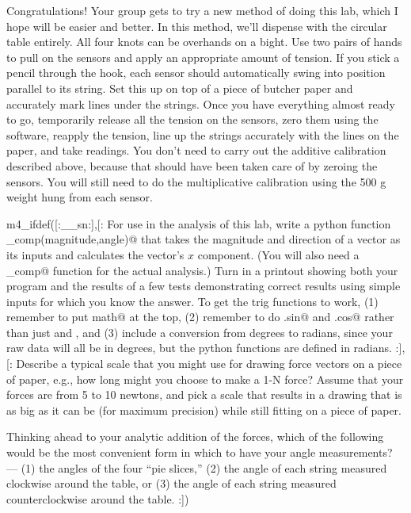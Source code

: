 Congratulations! Your group gets to try a new method of doing this lab, which I hope will be easier and
better. In this method, we'll dispense with the circular table entirely. All four knots can be overhands
on a bight. Use two pairs of hands to pull on the sensors and apply an appropriate amount of tension. If
you stick a pencil through the hook, each sensor should automatically swing into position parallel to its
string. Set this up on top of a piece of butcher paper and accurately mark lines under the strings.
Once you have everything almost ready to go, temporarily release all the tension on the sensors, zero them
using the software, reapply the tension, line up the strings accurately with the lines on the paper, and
take readings. You don't need to carry out the additive calibration described above, because that should
have been taken care of by zeroing the sensors. You will still need to do the multiplicative calibration
using the 500 g weight hung from each sensor.

\prelab

m4_ifdef([:__sn:],[:%
\prelabquestion For use in the analysis of this lab, write a python function \verb@x_comp(magnitude,angle)@ that
takes the magnitude and direction of a vector as its inputs and calculates the vector's $x$ component.
(You will also need a \verb@y_comp@ function for the actual analysis.)
Turn in a printout showing both your program and the results of a few tests demonstrating correct results
using simple inputs for which you know the answer.
To get the trig functions to work, (1) remember to put \verb@import math@ at the top, (2) remember to do \verb@math.sin@
and \verb@math.cos@ rather than just \verb@sin@ and \verb@cos@, and (3) include a conversion from degrees to radians, since
your raw data will all be in degrees, but the python functions are defined in radians.
:],[:%
\prelabquestion  Describe a typical scale that you might use for drawing
force vectors on a piece of paper, e.g., how long might you
choose to make a 1-N force?  Assume that your forces are
from 5 to 10 newtons, and pick a scale that results in a drawing that
is as big as it can be (for maximum precision) while still fitting on
a piece of paper.

\prelabquestion Thinking ahead to your analytic addition of the forces,
which of the following would be the most convenient form in which to have
your angle measurements? --- (1) the angles of the four ``pie slices,''
(2) the angle of each string measured clockwise around the table,
or (3) the angle of each string measured counterclockwise around the table.
:])

